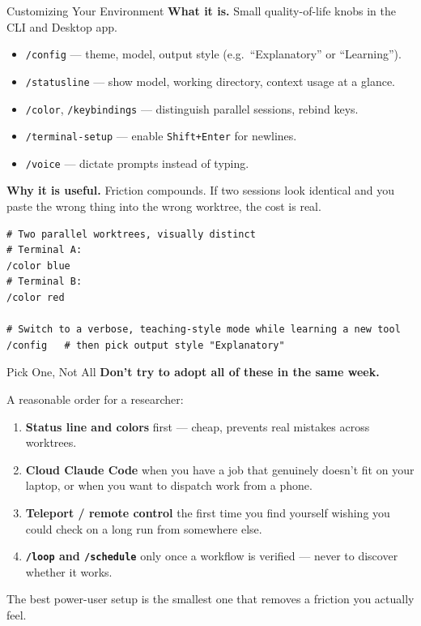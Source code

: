 \documentclass[aspectratio=169, 11pt]{beamer}
\begin{document}
\begin{frame}[fragile]{Customizing Your Environment}
  \textbf{What it is.} Small quality-of-life knobs in the CLI and Desktop app.
  \begin{itemize}\small
    \item \texttt{/config} --- theme, model, output style (e.g.\ ``Explanatory'' or ``Learning'').
    \item \texttt{/statusline} --- show model, working directory, context usage at a glance.
    \item \texttt{/color}, \texttt{/keybindings} --- distinguish parallel sessions, rebind keys.
    \item \texttt{/terminal-setup} --- enable \texttt{Shift+Enter} for newlines.
    \item \texttt{/voice} --- dictate prompts instead of typing.
  \end{itemize}

  \vspace{0.4em}
  \textbf{Why it is useful.} Friction compounds. If two sessions look identical and you paste the wrong thing into the wrong worktree, the cost is real.

  \vspace{0.3em}
  \begin{lstlisting}[basicstyle=\ttfamily\footnotesize]
# Two parallel worktrees, visually distinct
# Terminal A:
/color blue
# Terminal B:
/color red

# Switch to a verbose, teaching-style mode while learning a new tool
/config   # then pick output style "Explanatory"
  \end{lstlisting}
\end{frame}


\begin{frame}{Pick One, Not All}
  \textbf{Don't try to adopt all of these in the same week.}

  \vspace{0.6em}
  A reasonable order for a researcher:
  \begin{enumerate}\small
    \item \textbf{Status line and colors} first --- cheap, prevents real mistakes across worktrees.
    \item \textbf{Cloud Claude Code} when you have a job that genuinely doesn't fit on your laptop, or when you want to dispatch work from a phone.
    \item \textbf{Teleport / remote control} the first time you find yourself wishing you could check on a long run from somewhere else.
    \item \textbf{\texttt{/loop} and \texttt{/schedule}} only once a workflow is verified --- never to discover whether it works.
  \end{enumerate}

  \vspace{0.7em}
  \alert{The best power-user setup is the smallest one that removes a friction you actually feel.}
\end{frame}
\end{document}
